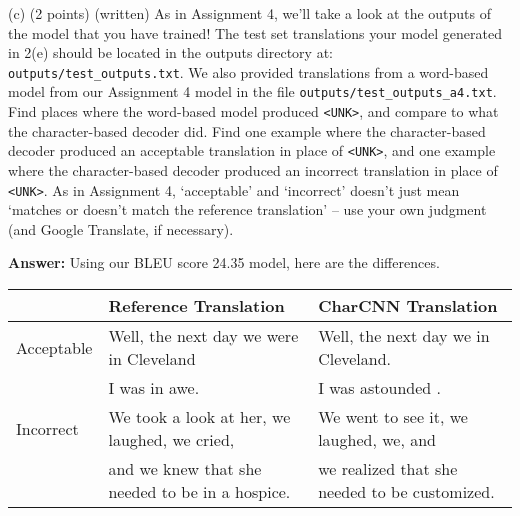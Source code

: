 \documentclass{article}
\begin{document}
\bigbreak
\noindent
(c) (2 points) (written) As in Assignment 4, we’ll take a look at the outputs of the model that you have trained! The test set translations your model generated in 2(e) should be located in the outputs directory at: \verb|outputs/test_outputs.txt|. We also provided translations from a word-based model from our Assignment 4 model in the file \verb|outputs/test_outputs_a4.txt|.
\smallbreak
\noindent
Find places where the word-based model produced \verb|<UNK>|, and compare to what the character-based decoder did. Find one example where the character-based decoder produced an acceptable translation in place of \verb|<UNK>|, and one example where the character-based decoder produced an incorrect translation in place of \verb|<UNK>|. As in Assignment 4, ‘acceptable’ and ‘incorrect’ doesn’t just  mean  ‘matches  or  doesn’t  match  the  reference  translation’ – use your own judgment (and Google Translate, if necessary).

\bigbreak
\noindent
\textbf{Answer:} Using our BLEU score 24.35 model, here are the differences.
\begin{center}
    \begin{tabular}{ l l l } 
        \hline
        & \textbf{Reference Translation} & \textbf{CharCNN Translation} \\ 
        \hline
        Acceptable & Well, the next day we were in Cleveland & Well, the next day we in Cleveland. \\
         & I was in awe. & I was astounded . \\
        \hline
        Incorrect & We took a look at her, we laughed, we cried, & We went to see it, we laughed, we, and \\
        & and we knew that she needed to be in a hospice. & we realized that she needed to be customized. \\
        \hline
    \end{tabular}
\end{center}
\end{document}
